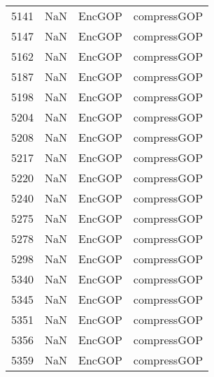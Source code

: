 \begin{tabular}{llll}
5141 &                   NaN &                     EncGOP &                               compressGOP \\
5147 &                   NaN &                     EncGOP &                               compressGOP \\
5162 &                   NaN &                     EncGOP &                               compressGOP \\
5187 &                   NaN &                     EncGOP &                               compressGOP \\
5198 &                   NaN &                     EncGOP &                               compressGOP \\
5204 &                   NaN &                     EncGOP &                               compressGOP \\
5208 &                   NaN &                     EncGOP &                               compressGOP \\
5217 &                   NaN &                     EncGOP &                               compressGOP \\
5220 &                   NaN &                     EncGOP &                               compressGOP \\
5240 &                   NaN &                     EncGOP &                               compressGOP \\
5275 &                   NaN &                     EncGOP &                               compressGOP \\
5278 &                   NaN &                     EncGOP &                               compressGOP \\
5298 &                   NaN &                     EncGOP &                               compressGOP \\
5340 &                   NaN &                     EncGOP &                               compressGOP \\
5345 &                   NaN &                     EncGOP &                               compressGOP \\
5351 &                   NaN &                     EncGOP &                               compressGOP \\
5356 &                   NaN &                     EncGOP &                               compressGOP \\
5359 &                   NaN &                     EncGOP &                               compressGOP \\

\end{tabular}
